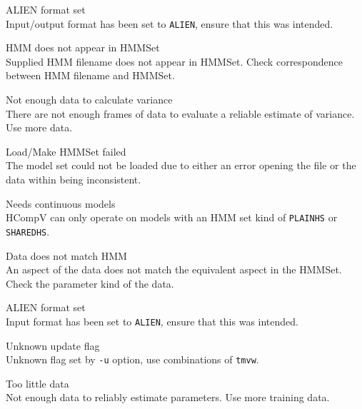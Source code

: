 \begin{itemize}
\begin{itemize}
\end{itemize}


\begin{itemize}
    ALIEN format set\\
        Input/output format has been set to \texttt{ALIEN}, ensure that 
        this was intended.

\end{itemize}


\begin{itemize}
    HMM does not appear in HMMSet\\
        Supplied HMM filename does not appear in HMMSet. Check
        correspondence between HMM filename and HMMSet.

    Not enough data to calculate variance\\
        There are not enough frames of data to evaluate a
        reliable estimate of variance. Use more data.

    Load/Make HMMSet failed\\
        The model set could not be loaded due to either an error opening the
        file or the data within being inconsistent.

    Needs continuous models\\
        HCompV can only operate on models with an HMM set kind
        of \texttt{PLAINHS} or \texttt{SHAREDHS}.

    Data does not match HMM\\
        An aspect of the data does not match the equivalent aspect in 
        the HMMSet.  Check the parameter kind of the data.

    ALIEN format set\\
        Input format has been set to \texttt{ALIEN}, ensure that this was 
        intended.

\end{itemize}


\begin{itemize}
    Unknown update flag\\
        Unknown flag set by \texttt{-u} option, use combinations of 
        \texttt{tmvw}.

    Too little data\\
        Not enough data to reliably estimate parameters.  Use more 
        training data.


\end{itemize}
\end{itemize}
